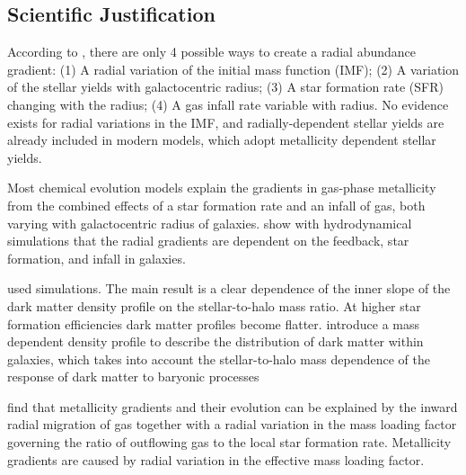 \documentclass[11pt, a4paper, onecolumn]{article}
\begin{document}

\begin{multicols}{2}

\section{Scientific Justification}

    According to \citet{goetz92}, there are only 4 possible ways to create a
    radial abundance gradient: (1) A radial variation of the initial mass
    function (IMF); (2) A variation of the stellar yields with galactocentric
    radius; (3) A star formation rate (SFR) changing with the radius; (4) A gas
    infall rate variable with radius. No evidence exists for radial variations
    in the IMF, and radially-dependent stellar yields are already included in
    modern models, which adopt metallicity dependent stellar yields. 

    Most chemical evolution models explain the gradients in gas-phase
    metallicity from the combined effects of a star formation rate and an
    infall of gas, both varying with galactocentric radius of galaxies.
    \citet{gibson13} show with hydrodynamical simulations that the radial
    gradients are dependent on the feedback, star formation, and infall in
    galaxies.
    
    \citet{dicintio14} used simulations. The main result is a clear dependence
    of the inner slope of the dark matter density profile on the
    stellar-to-halo mass ratio. At higher star formation efficiencies dark
    matter profiles become flatter. \citet{dicintio14b} introduce a mass
    dependent density profile to describe the distribution of dark matter
    within galaxies, which takes into account the stellar-to-halo mass
    dependence of the response of dark matter to baryonic processes

    \citet{jones13}  find that metallicity gradients and their evolution can be
    explained by the inward radial migration of gas together with a radial
    variation in the mass loading factor governing the ratio of outflowing gas
    to the local star formation rate. Metallicity gradients are caused by
    radial variation in the effective mass loading factor.


\end{multicols}
\end{document}
